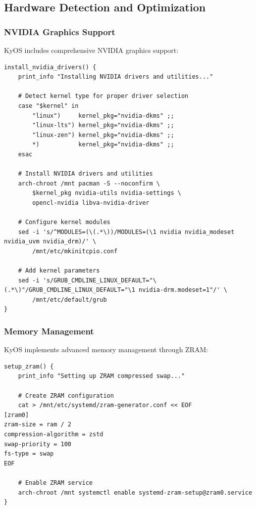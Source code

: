 \documentclass[12pt,a4paper]{article}
\begin{document}
\subsection{Hardware Detection and Optimization}

\subsubsection{NVIDIA Graphics Support}
KyOS includes comprehensive NVIDIA graphics support:

\begin{lstlisting}[caption=NVIDIA Detection and Installation]
install_nvidia_drivers() {
    print_info "Installing NVIDIA drivers and utilities..."
    
    # Detect kernel type for proper driver selection
    case "$kernel" in
        "linux")     kernel_pkg="nvidia-dkms" ;;
        "linux-lts") kernel_pkg="nvidia-dkms" ;;
        "linux-zen") kernel_pkg="nvidia-dkms" ;;
        *)           kernel_pkg="nvidia-dkms" ;;
    esac
    
    # Install NVIDIA drivers and utilities
    arch-chroot /mnt pacman -S --noconfirm \
        $kernel_pkg nvidia-utils nvidia-settings \
        opencl-nvidia libva-nvidia-driver
    
    # Configure kernel modules
    sed -i 's/^MODULES=(\(.*\))/MODULES=(\1 nvidia nvidia_modeset nvidia_uvm nvidia_drm)/' \
        /mnt/etc/mkinitcpio.conf
    
    # Add kernel parameters
    sed -i 's/GRUB_CMDLINE_LINUX_DEFAULT="\(.*\)"/GRUB_CMDLINE_LINUX_DEFAULT="\1 nvidia-drm.modeset=1"/' \
        /mnt/etc/default/grub
}
\end{lstlisting}

\subsubsection{Memory Management}
KyOS implements advanced memory management through ZRAM:

\begin{lstlisting}[caption=ZRAM Configuration]
setup_zram() {
    print_info "Setting up ZRAM compressed swap..."
    
    # Create ZRAM configuration
    cat > /mnt/etc/systemd/zram-generator.conf << EOF
[zram0]
zram-size = ram / 2
compression-algorithm = zstd
swap-priority = 100
fs-type = swap
EOF
    
    # Enable ZRAM service
    arch-chroot /mnt systemctl enable systemd-zram-setup@zram0.service
}
\end{lstlisting}
\end{document}
